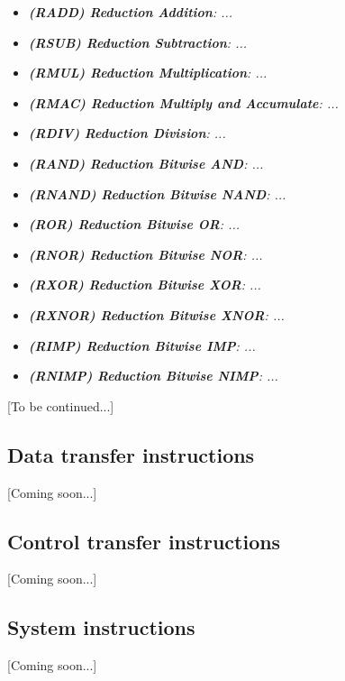         \begin{multicols}{2}

            \begin{itemize}

                \item \textit{\textbf{(RADD) Reduction Addition}: ...}

                \item \textit{\textbf{(RSUB) Reduction Subtraction}: ...}

                \item \textit{\textbf{(RMUL) Reduction Multiplication}: ...}

                \item \textit{\textbf{(RMAC) Reduction Multiply and Accumulate}: ...}

                \item \textit{\textbf{(RDIV) Reduction Division}: ...}

                \item \textit{\textbf{(RAND) Reduction Bitwise AND}: ...}

                \item \textit{\textbf{(RNAND) Reduction Bitwise NAND}: ...}

                \item \textit{\textbf{(ROR) Reduction Bitwise OR}: ...}

                \item \textit{\textbf{(RNOR) Reduction Bitwise NOR}: ...}

                \item \textit{\textbf{(RXOR) Reduction Bitwise XOR}: ...}

                \item \textit{\textbf{(RXNOR) Reduction Bitwise XNOR}: ...}

                \item \textit{\textbf{(RIMP) Reduction Bitwise IMP}: ...}

                \item \textit{\textbf{(RNIMP) Reduction Bitwise NIMP}: ...}

            \end{itemize}

        \end{multicols}

        [To be continued...]

    \subsection{Data transfer instructions}

        [Coming soon...]

    \subsection{Control transfer instructions}

        [Coming soon...]

    \subsection{System instructions}

        [Coming soon...]